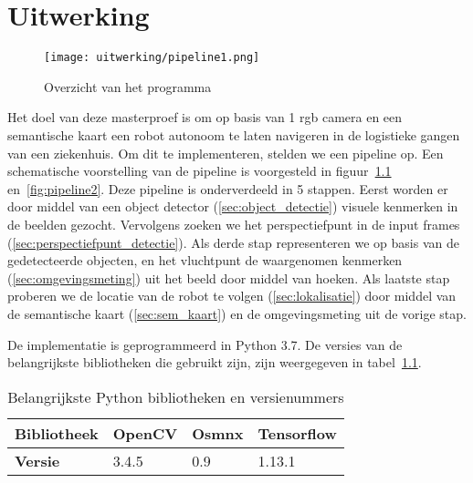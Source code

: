 
\chapter{Uitwerking}

\begin{figure}[!h]
    \centering
    \texttt{[image: uitwerking/pipeline1.png]}
    \caption{Overzicht van het programma}
    \label{fig:pipeline1}
\end{figure}

Het doel van deze masterproef is om op basis van 1 \gls{rgb} camera en een semantische kaart een robot autonoom te laten navigeren in de logistieke gangen van een ziekenhuis.
Om dit te implementeren, stelden we een pipeline op. Een schematische voorstelling van de pipeline is voorgesteld in figuur~\ref{fig:pipeline1} en~\ref{fig:pipeline2}.
Deze pipeline is onderverdeeld in 5 stappen.
Eerst worden er door middel van een object detector (\ref{sec:object_detectie}) visuele kenmerken in de beelden gezocht.
Vervolgens zoeken we het perspectiefpunt in de input frames (\ref{sec:perspectiefpunt_detectie}).
Als derde stap representeren we op basis van de gedetecteerde objecten, en het vluchtpunt de waargenomen kenmerken (\ref{sec:omgevingsmeting}) uit het beeld door middel van hoeken.
Als laatste stap proberen we de locatie van de robot te volgen (\ref{sec:lokalisatie}) door middel van de semantische kaart (\ref{sec:sem_kaart}) en de omgevingsmeting uit de vorige stap.

De implementatie is geprogrammeerd in Python 3.7. De versies van de belangrijkste bibliotheken die gebruikt zijn, zijn weergegeven in tabel~\ref{tab:versies}.

\begin{table}
    \centering
    \caption{Belangrijkste Python bibliotheken en versienummers}
    \label{tab:versies}
    \begin{tabular}{l|l|l|l}
        \textbf{Bibliotheek} & OpenCV & Osmnx & Tensorflow \\
        \hline
        \textbf{Versie} & 3.4.5 & 0.9 & 1.13.1 \\
    \end{tabular}
\end{table}


